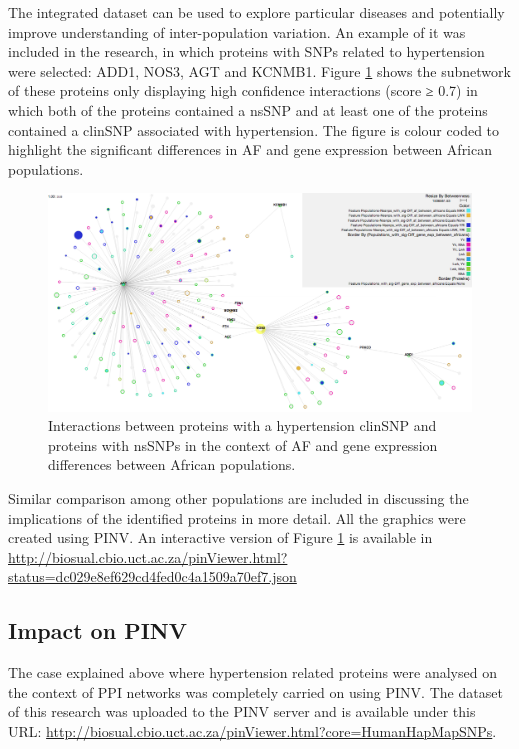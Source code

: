 The integrated dataset can be used to explore particular diseases and potentially improve understanding of inter-population variation. An example of it was included in the research, in which proteins with SNPs related to hypertension were selected: ADD1, NOS3, AGT and KCNMB1. Figure \ref{fig:pinv_human_snps} shows the subnetwork of these proteins only displaying high confidence interactions (score ≥ 0.7) in which both of the proteins contained a nsSNP and at least one of the proteins contained a clinSNP associated with hypertension. The figure is colour coded to highlight the significant differences in AF and gene expression between African populations. 

\begin{figure}
\centering
\includegraphics[width=\textwidth]{figures/pinv_human_snps.png}
\caption[Interactions between proteins with a hypertension clinSNP]{Interactions between proteins with a hypertension clinSNP and proteins with nsSNPs in the context of AF and gene expression differences between African populations.
\label{fig:pinv_human_snps}}
\end{figure}

Similar comparison among other populations are included in \cite{HEE2014} discussing the implications of the identified proteins in more detail. All the graphics were created using PINV. An interactive version of Figure \ref{fig:pinv_human_snps} is available in \url{http://biosual.cbio.uct.ac.za/pinViewer.html?status=dc029e8ef629cd4fed0c4a1509a70ef7.json}

\subsection{Impact on PINV}
The case explained above where hypertension related proteins were analysed on the context of PPI networks was completely carried on using PINV. The dataset of this research was uploaded to the PINV server and is available under this URL: \url{http://biosual.cbio.uct.ac.za/pinViewer.html?core=HumanHapMapSNPs}. 

